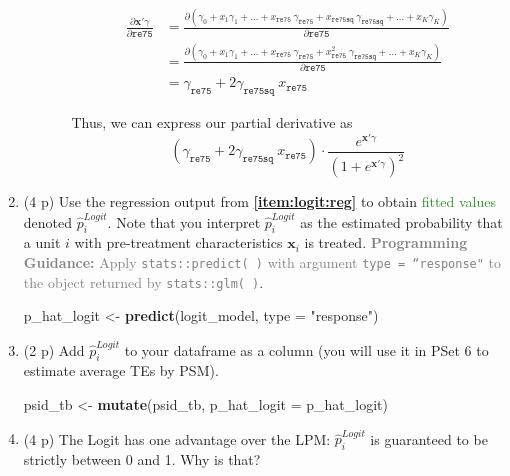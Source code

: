 \documentclass[
]{article}
\newenvironment{Shaded}{\begin{snugshade}}{\end{snugshade}}
\newcommand{\AttributeTok}[1]{\textcolor[rgb]{0.13,0.29,0.53}{#1}}
\newcommand{\FunctionTok}[1]{\textcolor[rgb]{0.13,0.29,0.53}{\textbf{#1}}}
\newcommand{\NormalTok}[1]{#1}
\newcommand{\OtherTok}[1]{\textcolor[rgb]{0.56,0.35,0.01}{#1}}
\newcommand{\StringTok}[1]{\textcolor[rgb]{0.31,0.60,0.02}{#1}}
\begin{document}
\begin{enumerate}
\begin{enumerate}
\begin{enumerate}
      \begin{align*}
          \frac{\partial \mathbf{x}'\gamma}{\partial \texttt{re75}} &= \frac{\partial (\gamma_0 + x_1 \gamma_1 + \ldots + x_{\texttt{re75}} \ \gamma_{\texttt{re75}} + x_{\texttt{re75sq}} \ \gamma_{\texttt{re75sq}} + \ldots + x_K\gamma_K)}{\partial \texttt{re75}} \\
          &= \frac{\partial (\gamma_0 + x_1 \gamma_1 + \ldots + x_{\texttt{re75}} \ \gamma_{\texttt{re75}} + x_{\texttt{re75}}^2 \ \gamma_{\texttt{re75sq}} + \ldots + x_K\gamma_K)}{\partial \texttt{re75}} \\
          &= \gamma_{\texttt{re75}} + 2\gamma_{\texttt{re75sq}} \ x_{\texttt{re75}}
      \end{align*}

      Thus, we can express our partial derivative as \[
           (\gamma_{\texttt{re75}} + 2\gamma_{\texttt{re75sq}} \ x_{\texttt{re75}}) \cdot \frac{e^{\mathbf{x}'\gamma}}{\left(1 + e^{\mathbf{x}'\gamma}\right)^2}
      \]
    \end{enumerate}
  \end{enumerate}
\item
  (4 p) Use the regression output from \textbf{\ref{item:logit:reg}} to
  obtain \textcolor{ForestGreen}{fitted values} denoted
  \(\hat{p}_i^{Logit}\). Note that you interpret \(\hat{p}_i^{Logit}\)
  as the estimated probability that a unit \(i\) with pre-treatment
  characteristics \(\mathbf{x}_i\) is treated.
  \textcolor{gray}{\textbf{Programming Guidance:} Apply \texttt{stats::predict( )} with argument \texttt{type = ``response"} to the object returned by \texttt{stats::glm( )}}.\label{item:logit:fitted}

\begin{Shaded}
\begin{Highlighting}[]
\NormalTok{p\_hat\_logit }\OtherTok{\textless{}{-}} \FunctionTok{predict}\NormalTok{(logit\_model, }\AttributeTok{type =} \StringTok{"response"}\NormalTok{)}
\end{Highlighting}
\end{Shaded}
\item
  (2 p) Add \(\hat{p}_i^{Logit}\) to your dataframe as a column (you
  will use it in PSet 6 to estimate average TEs by PSM).

\begin{Shaded}
\begin{Highlighting}[]
\NormalTok{psid\_tb }\OtherTok{\textless{}{-}} \FunctionTok{mutate}\NormalTok{(psid\_tb, }\AttributeTok{p\_hat\_logit =}\NormalTok{ p\_hat\_logit)}
\end{Highlighting}
\end{Shaded}
\item
  (4 p) The Logit has one advantage over the LPM: \(\hat{p}_i^{Logit}\)
  is guaranteed to be strictly between 0 and 1. Why is that?
\end{enumerate}
\end{document}

